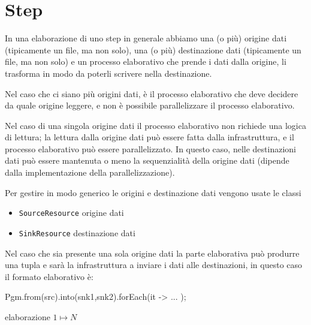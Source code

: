\chapter{Step}

In una elaborazione di uno step in generale abbiamo una (o più) origine dati
(tipicamente un file, ma non solo), una (o più) destinazione dati (tipicamente
un file, ma non solo) e un processo elaborativo che prende i dati dalla origine,
li trasforma in modo da poterli scrivere nella destinazione.

Nel caso che ci siano più origini dati, è il processo elaborativo che deve
decidere da quale origine leggere, e non è possibile parallelizzare il processo
elaborativo.

Nel caso di una singola origine dati il processo elaborativo non richiede una
logica di lettura; la lettura dalla origine dati può essere fatta dalla
infrastruttura, e il processo elaborativo può essere parallelizzato.
In questo caso, nelle destinazioni dati può essere mantenuta o meno la
sequenzialità della origine dati (dipende dalla implementazione della
parallelizzazione).

Per gestire in modo generico le origini e destinazione dati vengono usate le
classi
\begin{itemize}
\item \texttt{SourceResource} origine dati
\item \texttt{SinkResource} destinazione dati
\end{itemize}

Nel caso che sia presente una sola origine dati la parte elaborativa può
produrre una tupla e sarà la infrastruttura a inviare i dati alle destinazioni,
in questo caso il formato elaborativo è:
\begin{elisting}[!htb]
\begin{javacode}
    Pgm.from(src).into(snk1,snk2).forEach(it -> { ... });
\end{javacode}
\caption{elaborazione $1\mapsto N$}
\label{lst:processTuple}
\end{elisting}


